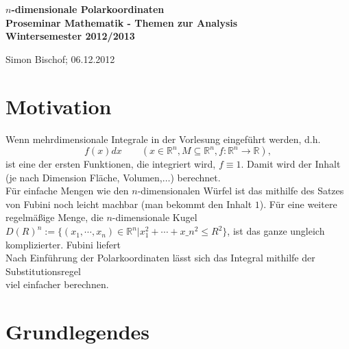\documentclass[a4paper,11pt]{report}
\theoremstyle{definition}
\newcommand{\R}{{\ensuremath{\mathbb{R}}}}
\newcommand{\const}{\ensuremath{\equiv}}
\begin{document}
\begin{titlepage}
	\begin{center}	
		\LARGE \textbf{$n$-dimensionale Polarkoordinaten \\[5ex]
			{\Large Proseminar Mathematik - Themen zur Analysis \\[5ex] 
    		Wintersemester 2012/2013}\\[5ex]}
	\end{center}
	\begin{center}
		Simon Bischof; 06.12.2012 %
	\end{center}
\end{titlepage}
\clearpage{}
\setcounter{tocdepth}{1}

\clearpage{}
\chapter{Motivation}
Wenn mehrdimensionale Integrale in der Vorlesung eingeführt werden, d.h.
\begin{equation}
f(x)dx \qquad (x\in\R^n,M\subseteq \R^n, f:\R^n\to\R),\end{equation}  %
ist eine der ersten Funktionen, die integriert wird, $f\const 1$. Damit wird der Inhalt (je nach Dimension Fläche, Volumen,$\ldots$) berechnet.\\
Für einfache Mengen wie den $n$-dimensionalen Würfel %
ist das mithilfe des Satzes von Fubini noch leicht machbar (man bekommt den Inhalt $1$). Für eine weitere regelmäßige Menge, die $n$-dimensionale Kugel $D(R)^n:=\{(x_1,\cdots,x_n)\in\R^n|x_1^2+\cdots+x\_n^2\leq R^2\}$, ist das ganze ungleich komplizierter. Fubini liefert
\begin{equation}
\label{fubini}
\end{equation} %
Nach Einführung der Polarkoordinaten lässt sich das Integral mithilfe der Substitutionsregel
\begin{equation}
\label{subst}
\end{equation} %
viel einfacher berechnen.
\chapter{Grundlegendes}
\end{document}
